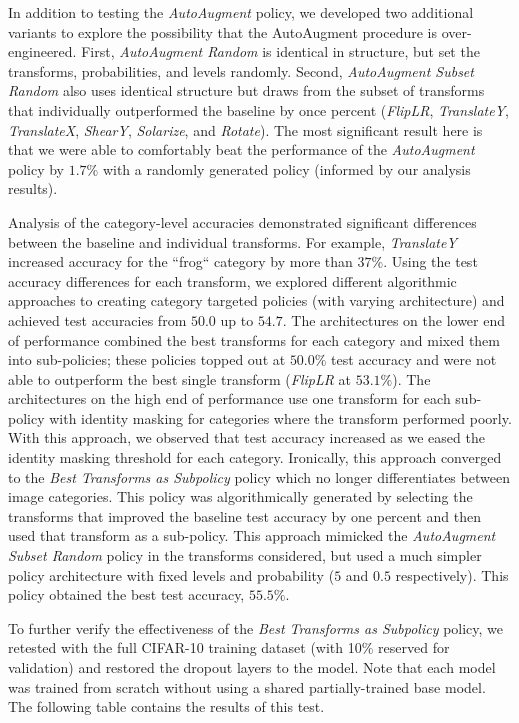 \documentclass[10pt,twocolumn,letterpaper]{article}
\begin{document}
		In addition to testing the \textit{AutoAugment} policy, we developed two additional variants to explore the possibility that the AutoAugment procedure is over-engineered. First, \textit{AutoAugment Random} is identical in structure, but set the transforms, probabilities, and levels randomly. Second, \textit{AutoAugment Subset Random} also uses identical structure but draws from the subset of transforms that individually outperformed the baseline by once percent (\textit{FlipLR}, \textit{TranslateY}, \textit{TranslateX}, \textit{ShearY}, \textit{Solarize}, and \textit{Rotate}). The most significant result here is that we were able to comfortably beat the performance of the \textit{AutoAugment} policy by $1.7\%$ with a randomly generated policy (informed by our analysis results).
		
		Analysis of the category-level accuracies demonstrated significant differences between the baseline and individual transforms. For example, \textit{TranslateY} increased accuracy for the ``frog`` category by more than $37\%$. Using the test accuracy differences for each transform, we explored different algorithmic approaches to creating category targeted policies (with varying architecture) and achieved test accuracies from $50.0$ up to $54.7$. The architectures on the lower end of performance combined the best transforms for each category and mixed them into sub-policies; these policies topped out at $50.0\%$ test accuracy and were not able to outperform the best single transform (\textit{FlipLR} at $53.1\%$). The architectures on the high end of performance use one transform for each sub-policy with identity masking for categories where the transform performed poorly. With this approach, we observed that test accuracy increased as we eased the identity masking threshold for each category. Ironically, this approach converged to the \textit{Best Transforms as Subpolicy} policy which no longer differentiates between image categories. This policy was algorithmically generated by selecting the transforms that improved the baseline test accuracy by one percent and then used that transform as a sub-policy. This approach mimicked the \textit{AutoAugment Subset Random} policy in the transforms considered, but used a much simpler policy architecture with fixed levels and probability ($5$ and $0.5$ respectively). This policy obtained the best test accuracy, $55.5\%$. 
		
	
		To further verify the effectiveness of the \textit{Best Transforms as Subpolicy} policy, we retested with the full CIFAR-10 training dataset (with 10\% reserved for validation) and restored the dropout layers to the model. Note that each model was trained from scratch without using a shared partially-trained base model. The following table contains the results of this test.
		
\end{document}

